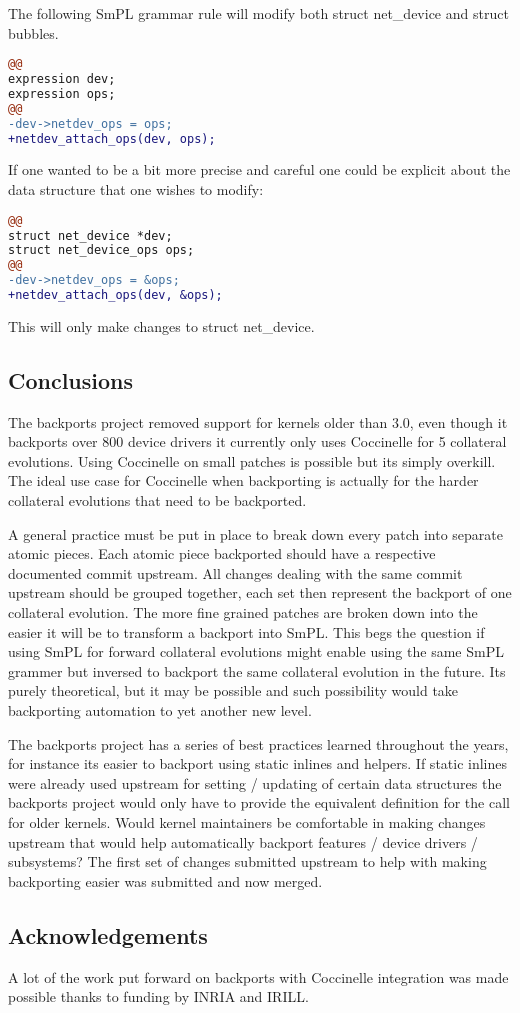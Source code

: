 \documentclass[a4paper,10pt]{article}
\begin{document}
The following SmPL grammar rule will modify both struct net\_device
and struct bubbles.

\begin{lstlisting}[language=diff]
@@
expression dev;
expression ops;
@@
-dev->netdev_ops = ops;
+netdev_attach_ops(dev, ops);
\end{lstlisting}

If one wanted to be a bit more precise and careful one
could be explicit about the data structure that
one wishes to modify:

\begin{lstlisting}[language=diff]
@@
struct net_device *dev;
struct net_device_ops ops;
@@
-dev->netdev_ops = &ops;
+netdev_attach_ops(dev, &ops);
\end{lstlisting}

This will only make changes to struct net\_device.

\subsection{Conclusions}

The backports project removed support for kernels older than 3.0, even though
it backports over 800 device drivers it currently only uses Coccinelle for 5
collateral evolutions. Using Coccinelle on small patches is possible but its
simply overkill. The ideal use case for Coccinelle when backporting is actually
for the harder collateral evolutions that need to be backported.

A general practice must be put in place to break down every patch into separate
atomic pieces.  Each atomic piece backported should have a respective
documented commit upstream. All changes dealing with the same commit upstream
should be grouped together, each set then represent the backport of one
collateral evolution. The more fine grained patches are broken down into the
easier it will be to transform a backport into SmPL.  This begs the question if
using SmPL for forward collateral evolutions might enable using the same SmPL
grammer but inversed to backport the same collateral evolution in the future.
Its purely theoretical, but it may be possible and such possibility would
take backporting automation to yet another new level.

The backports project has a series of best practices learned throughout the
years, for instance its easier to backport using static inlines and helpers.
If static inlines were already used upstream for setting / updating of certain
data structures the backports project would only have to provide the equivalent
definition for the call for older kernels. Would kernel maintainers be
comfortable in making changes upstream that would help automatically backport
features / device drivers / subsystems? The first set of changes submitted
upstream to help with making backporting easier was submitted and now merged.

\subsection{Acknowledgements}

A lot of the work put forward on backports with Coccinelle integration
was made possible thanks to funding by INRIA and IRILL.
\end{document}
